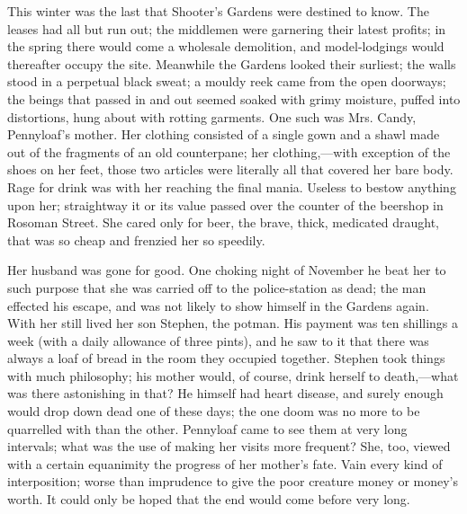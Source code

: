 This winter was the last that Shooter's Gardens were destined to know.
The leases had all but run out; the middlemen were garnering their
latest profits; in the spring there would come a wholesale demolition,
and model-lodgings would thereafter occupy the site. Meanwhile the
Gardens looked their surliest; the walls stood in a perpetual black
sweat; a mouldy reek came from the open doorways; the beings that passed
in and out seemed soaked with grimy moisture, puffed into distortions,
hung about with rotting garments. One such was Mrs. Candy, Pennyloaf's
mother. Her clothing consisted of a single gown and a shawl made out of
the fragments of an old counterpane; her clothing,---with exception of
the shoes on her feet, those two articles were literally all that
covered her bare body. Rage for drink was with her reaching the final
mania. Useless to bestow anything {}upon her; straightway it or its
value passed over the counter of the beershop in Rosoman Street. She
cared only for beer, the brave, thick, medicated draught, that was so
cheap and frenzied her so speedily.

Her husband was gone for good. One choking night of November he beat her
to such purpose that she was carried off to the police-station as dead;
the man effected his escape, and was not likely to show himself in the
Gardens again. With her still lived her son Stephen, the potman. His
payment was ten shillings a week (with a daily allowance of three
pints), and he saw to it that there was always a loaf of bread in the
room they occupied together. Stephen took things with much philosophy;
his mother would, of course, drink herself to death,---what was there
astonishing in that? He himself had heart disease, and surely enough
would drop down dead one of these days; the one doom was no more to be
quarrelled with than the other. Pennyloaf came to see them at very long
intervals; what was the use of making her visits more frequent? She,
too, viewed with a certain equanimity the progress of her mother's fate.
{}Vain every kind of interposition; worse than imprudence to give the
poor creature money or money's worth. It could only be hoped that the
end would come before very long.

